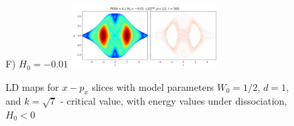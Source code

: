 \documentclass[10pt,aps,onecolumn,superscriptaddress]{revtex4-2}
\begin{document}
\begin{figure}
    F) $H_0 = -0.01$ \includegraphics[width=0.5\textwidth]{notebooks/bifurcation/k_critical/LD_total_x-px_tau_500_k_kc_E_-0.01.png}
    \caption{LD maps for $x-p_x$ slices with model parameters $W_0 = 1/2$, $d = 1$, and $k = \sqrt{7}$ - critical value, with energy values under dissociation, $H_0 < 0$}
\end{figure}

%
%
\end{document}
